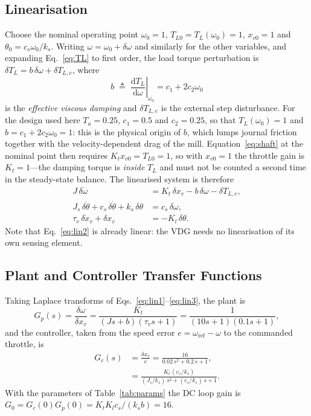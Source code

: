 \documentclass[conference]{IEEEtran}
\begin{document}
\subsection{Linearisation}
Choose the nominal operating point $\omega_0=1$, $T_{L0}=T_L(\omega_0)=1$,
$x_{v0}=1$ and $\theta_0=c_s\omega_0/k_s$. Writing $\omega=\omega_0+\delta\omega$
and similarly for the other variables, and expanding Eq.~\eqref{eq:TL} to first
order, the load torque perturbation is
$\delta T_L=b\,\delta\omega+\delta T_{L,e}$, where
\begin{equation}
b\;\triangleq\;\left.\frac{\mathrm dT_L}{\mathrm d\omega}\right|_{\omega_0}
=c_1+2c_2\omega_0
\label{eq:bdef}
\end{equation}
is the \emph{effective viscous damping} and $\delta T_{L,e}$ is the external step
disturbance. For the design used here $T_a=0.25$, $c_1=0.5$ and $c_2=0.25$, so that
$T_L(\omega_0)=1$ and $b=c_1+2c_2\omega_0=1$: this is the physical origin of $b$,
which lumps journal friction together with the velocity-dependent drag of the mill.
Equation~\eqref{eq:shaft} at the nominal point then requires
$K_tx_{v0}=T_{L0}=1$, so with $x_{v0}=1$ the throttle gain is $K_t=1$---the damping
torque is \emph{inside} $T_L$ and must not be counted a second time in the
steady-state balance. The linearised system is therefore
\begin{align}
J\,\delta\dot\omega &= K_t\,\delta x_v-b\,\delta\omega-\delta T_{L,e},\label{eq:lin1}\\
J_s\,\delta\ddot\theta+c_s\,\delta\dot\theta+k_s\,\delta\theta&=c_s\,\delta\omega,\label{eq:lin2}\\
\tau_v\,\delta\dot x_v+\delta x_v&=-K_l\,\delta\theta.\label{eq:lin3}
\end{align}
Note that Eq.~\eqref{eq:lin2} is already linear: the VDG needs no linearisation of
its own sensing element.

\subsection{Plant and Controller Transfer Functions}
Taking Laplace transforms of Eqs.~\eqref{eq:lin1}--\eqref{eq:lin3}, the plant is
\begin{equation}
G_p(s)=\frac{\delta\omega}{\delta x_v}
=\frac{K_t}{(Js+b)(\tau_vs+1)}
=\frac{1}{(10s+1)(0.1s+1)},
\label{eq:Gp}
\end{equation}
and the controller, taken from the speed error
$e=\omega_{\mathrm{ref}}-\omega$ to the commanded throttle, is
\begin{equation}
\begin{aligned}
G_c(s)&=\frac{\delta x_v}{e}=\frac{16}{0.02\,s^{2}+0.2\,s+1},\\
&=\frac{K_l\,(c_s/k_s)}{(J_s/k_s)\,s^{2}+(c_s/k_s)\,s+1}.
\end{aligned}
\label{eq:Gc}
\end{equation}
With the parameters of Table~\ref{tab:params} the DC loop gain is
$G_0=G_c(0)G_p(0)=K_tK_lc_s/(k_sb)=16$.
\end{document}
